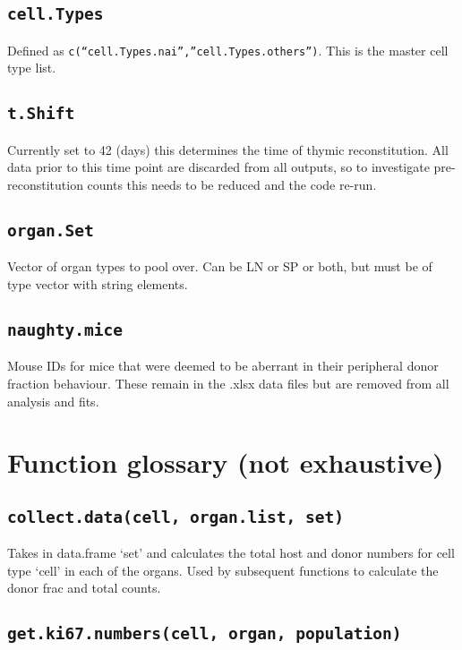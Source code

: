 \documentclass{tufte-book} %
\begin{document}
\subsection{\texttt{cell.Types}}
Defined as \texttt{c(``cell.Types.nai'',''cell.Types.others'')}. This is the master cell type list. 


\subsection{\texttt{t.Shift}}

 Currently set to 42 (days) this determines the time of thymic reconstitution. All data prior to this time point are discarded from all outputs, so to investigate pre-reconstitution counts this needs to be reduced and the code re-run. 

\subsection{\texttt{organ.Set}}

 Vector of organ types to pool over. Can be LN or SP or both, but must be of type vector with string elements. 

\subsection{\texttt{naughty.mice}}

 Mouse IDs for mice that were deemed to be aberrant in their peripheral donor fraction behaviour. These remain in the .xlsx data files but are removed from all analysis and fits.
 
\section{Function glossary (not exhaustive)}

\subsection{\texttt{collect.data(cell, organ.list, set)}}

 Takes in data.frame `set' and calculates the total host and donor numbers for cell type `cell' in each of the organs. Used by subsequent functions to calculate the donor frac and total counts.

\subsection{\texttt{get.ki67.numbers(cell, organ, population)}} 
\end{document}
